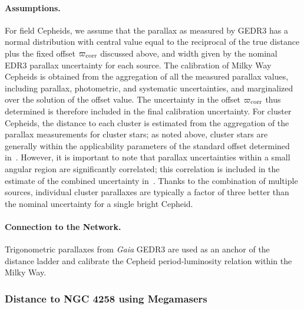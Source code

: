 \paragraph{Assumptions.}
For field Cepheids, we assume that the parallax as measured by GEDR3 has a normal distribution with central value equal to the reciprocal of the true distance plus the fixed offset $\varpi_{\rm corr} $ discussed above, and width given by the nominal EDR3 parallax uncertainty for each source.  The calibration of Milky Way Cepheids is obtained from the aggregation of all the measured parallax values, including parallax, photometric, and systematic uncertainties, and marginalized over the solution of the offset value.  The uncertainty in the offset $\varpi_{\rm corr} $ thus determined is therefore included in the final calibration uncertainty.  
For cluster Cepheids, the distance to each cluster is estimated from the aggregation of the parallax measurements for cluster stars; as noted above, cluster stars are generally within the applicability parameters of the standard offset determined in~\citet{2021A&A...649A...4L}.  However, it is important to note that parallax uncertainties within a small angular region are significantly correlated; this correlation is included in the estimate of the combined uncertainty in~\citet{2022ApJ...938...36R}.  Thanks to the combination of multiple sources, individual cluster parallaxes are typically a factor of three better than the nominal uncertainty for a single bright Cepheid.

\paragraph{Connection to the Network.}
Trigonometric parallaxes from {\it Gaia} GEDR3 are used as an anchor of the distance ladder and calibrate the Cepheid period-luminosity relation within the Milky Way.


\subsubsection{Distance to NGC 4258 using Megamasers}
\label{sec:NGC4258MM}

